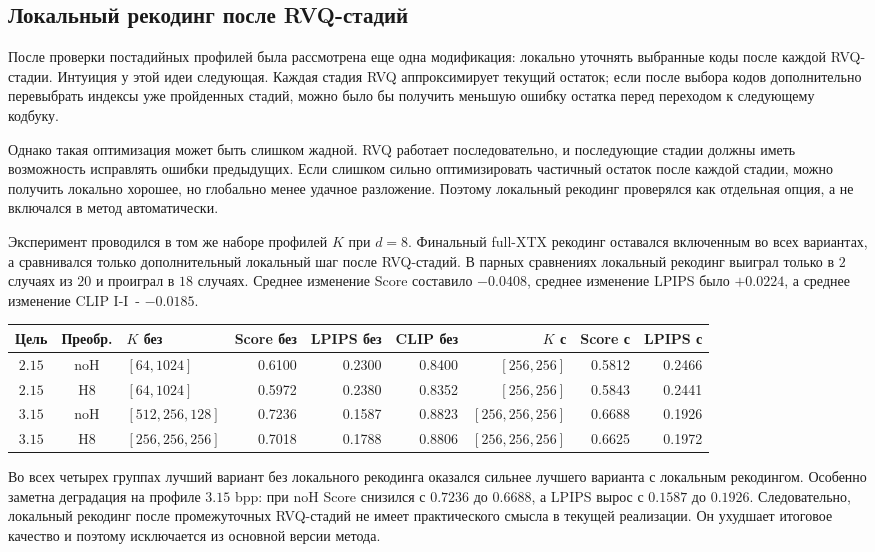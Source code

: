 \documentclass[a4paper,12pt]{article}
\begin{document}
\subsection{Локальный рекодинг после RVQ-стадий}

После проверки постадийных профилей была рассмотрена еще одна модификация: локально уточнять выбранные коды после каждой RVQ-стадии. Интуиция у этой идеи следующая. Каждая стадия RVQ аппроксимирует текущий остаток; если после выбора кодов дополнительно перевыбрать индексы уже пройденных стадий, можно было бы получить меньшую ошибку остатка перед переходом к следующему кодбуку.

Однако такая оптимизация может быть слишком жадной. RVQ работает последовательно, и последующие стадии должны иметь возможность исправлять ошибки предыдущих. Если слишком сильно оптимизировать частичный остаток после каждой стадии, можно получить локально хорошее, но глобально менее удачное разложение. Поэтому локальный рекодинг проверялся как отдельная опция, а не включался в метод автоматически.

Эксперимент проводился в том же наборе профилей $K$ при $d=8$. Финальный full-XTX рекодинг оставался включенным во всех вариантах, а сравнивался только дополнительный локальный шаг после RVQ-стадий. В парных сравнениях локальный рекодинг выиграл только в $2$ случаях из $20$ и проиграл в $18$ случаях. Среднее изменение Score составило $-0.0408$, среднее изменение LPIPS было $+0.0224$, а среднее изменение CLIP I-I~- $-0.0185$.

\begin{center}
\small
\begin{tabular}{@{}cclrrrrrr@{}}
\hline
Цель & Преобр. & $K$ без & Score без & LPIPS без & CLIP без & $K$ с & Score с & LPIPS с \\
\hline
$2.15$ & noH & $[64,1024]$ & 0.6100 & 0.2300 & 0.8400 & $[256,256]$ & 0.5812 & 0.2466 \\
$2.15$ & H8  & $[64,1024]$ & 0.5972 & 0.2380 & 0.8352 & $[256,256]$ & 0.5843 & 0.2441 \\
$3.15$ & noH & $[512,256,128]$ & 0.7236 & 0.1587 & 0.8823 & $[256,256,256]$ & 0.6688 & 0.1926 \\
$3.15$ & H8  & $[256,256,256]$ & 0.7018 & 0.1788 & 0.8806 & $[256,256,256]$ & 0.6625 & 0.1972 \\
\hline
\end{tabular}
\end{center}

Во всех четырех группах лучший вариант без локального рекодинга оказался сильнее лучшего варианта с локальным рекодингом. Особенно заметна деградация на профиле $3.15$ bpp: при noH Score снизился с $0.7236$ до $0.6688$, а LPIPS вырос с $0.1587$ до $0.1926$. Следовательно, локальный рекодинг после промежуточных RVQ-стадий не имеет практического смысла в текущей реализации. Он ухудшает итоговое качество и поэтому исключается из основной версии метода.
\end{document}

